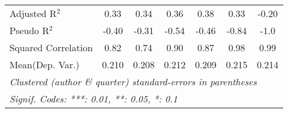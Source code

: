 \begin{tabular}{lcccccc}
   Adjusted R$^2$                                             & 0.33          & 0.34           & 0.36         & 0.38    & 0.33    & -0.20\\  
   Pseudo R$^2$                                               & -0.40         & -0.31          & -0.54        & -0.46   & -0.84   & -1.0\\  
   Squared Correlation                                        & 0.82          & 0.74           & 0.90         & 0.87    & 0.98    & 0.99\\  
Mean(Dep. Var.) & 0.210 & 0.208 & 0.212 & 0.209 & 0.215 & 0.214 \\
   \midrule \midrule
   \multicolumn{7}{l}{\emph{Clustered (author \& quarter) standard-errors in parentheses}}\\
   \multicolumn{7}{l}{\emph{Signif. Codes: ***: 0.01, **: 0.05, *: 0.1}}\\
\end{tabular}
\par\endgroup
